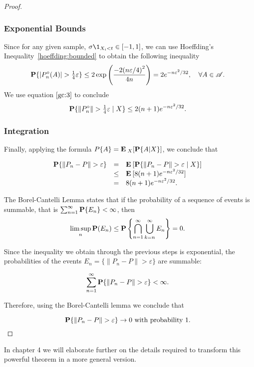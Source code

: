 \begin{proof}
  \subsubsection*{Exponential Bounds}

  Since for any given sample, $\sigma \1_{X_i < t} \in [-1,1]$, we can use Hoeffding's Inequality~\ref{hoeffding:bounded} to obtain the following inequality
  \[ \P \{ |P_n^\circ(A)| > \tfrac{1}{4} \varepsilon \} \leq 2 \exp\left( \frac{-2{(n\varepsilon/4)}^2}{4n}\right) = 2e^{-n\varepsilon^2/32}, \hspace*{1em} \forall A \in \AA.\]
  We use equation $\ref{gc:3}$ to conclude
  \begin{equation} \label{gc:4}
    \P\{ \|P_n^\circ\| > \tfrac{1}{4} \varepsilon \;|\; X\} \leq 2(n+1) e^{-n\varepsilon^2/32}.
  \end{equation} 

  \vspace*{1em}

  \subsubsection*{Integration}

  Finally, applying the formula $P\{A\} = \E_X[\P\{A | X\}]$, we conclude that

  \begin{equation}
    \label{gc:5}\begin{array}{rcl}
      \P \{\|P_n-P\| > \varepsilon\} & = & \E [\P \{\|P_n-P\| > \varepsilon \;|\; X\}]\\
      & \leq & \E [8(n+1) e^{-n\varepsilon^2/32}]\\
      & = & 8(n+1) e^{-n\varepsilon^2/32}.
    \end{array} 
  \end{equation}

  The Borel-Cantelli Lemma states that if the probability of a sequence of events is summable, that is \(\sum_{n = 1}^\infty \P\{E_n\} < \infty\), then
  \[ \limsup_n \P(E_n) \leq \P \left\{ \bigcap_{n=1}^{\infty}\bigcup_{k = n}^{\infty} E_n\right\} = 0. \] 

  Since the inequality we obtain through the previous steps is exponential, the probabilities of the events $E_n = \{\|P_n-P\| > \varepsilon\}$ are summable:

  \[  \sum_{n = 1}^\infty \P \{\|P_n-P\| > \varepsilon\} < \infty .\] 

  Therefore, using the Borel-Cantelli lemma we conclude that

  \[ \P \{\|P_n-P\| > \varepsilon\} \to 0 \mbox{ with probability 1.} \] 
\end{proof}

In chapter 4 we will elaborate further on the details required to transform this powerful theorem in a more general version.

